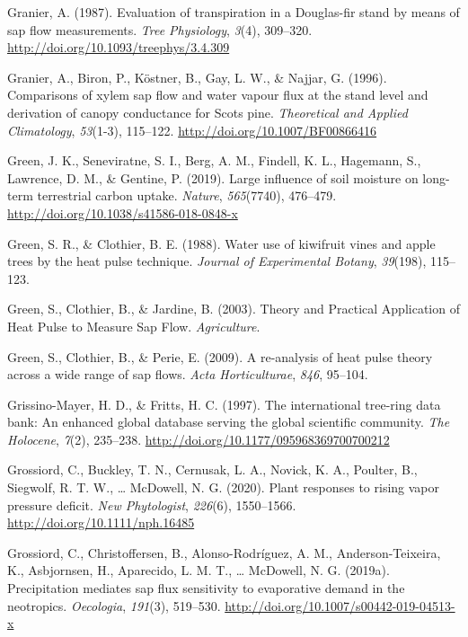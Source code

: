 \documentclass[11pt,twoside]{reedthesis}
\begin{document}
\hypertarget{ref-Granier1987}{}
Granier, A. (1987). Evaluation of transpiration in a Douglas-fir stand
by means of sap flow measurements. \emph{Tree Physiology}, \emph{3}(4),
309--320. \url{http://doi.org/10.1093/treephys/3.4.309}

\hypertarget{ref-Granier1996}{}
Granier, A., Biron, P., Köstner, B., Gay, L. W., \& Najjar, G. (1996).
Comparisons of xylem sap flow and water vapour flux at the stand level
and derivation of canopy conductance for Scots pine. \emph{Theoretical
and Applied Climatology}, \emph{53}(1-3), 115--122.
\url{http://doi.org/10.1007/BF00866416}

\hypertarget{ref-green_large_2019}{}
Green, J. K., Seneviratne, S. I., Berg, A. M., Findell, K. L., Hagemann,
S., Lawrence, D. M., \& Gentine, P. (2019). Large influence of soil
moisture on long-term terrestrial carbon uptake. \emph{Nature},
\emph{565}(7740), 476--479.
\url{http://doi.org/10.1038/s41586-018-0848-x}

\hypertarget{ref-Green1988}{}
Green, S. R., \& Clothier, B. E. (1988). Water use of kiwifruit vines
and apple trees by the heat pulse technique. \emph{Journal of
Experimental Botany}, \emph{39}(198), 115--123.

\hypertarget{ref-Green2003}{}
Green, S., Clothier, B., \& Jardine, B. (2003). Theory and Practical
Application of Heat Pulse to Measure Sap Flow. \emph{Agriculture}.

\hypertarget{ref-Green2009}{}
Green, S., Clothier, B., \& Perie, E. (2009). A re-analysis of heat
pulse theory across a wide range of sap flows. \emph{Acta
Horticulturae}, \emph{846}, 95--104.

\hypertarget{ref-Henri1997}{}
Grissino-Mayer, H. D., \& Fritts, H. C. (1997). The international
tree-ring data bank: An enhanced global database serving the global
scientific community. \emph{The Holocene}, \emph{7}(2), 235--238.
\url{http://doi.org/10.1177/095968369700700212}

\hypertarget{ref-grossiord_plant_2020}{}
Grossiord, C., Buckley, T. N., Cernusak, L. A., Novick, K. A., Poulter,
B., Siegwolf, R. T. W., \ldots{} McDowell, N. G. (2020). Plant responses
to rising vapor pressure deficit. \emph{New Phytologist}, \emph{226}(6),
1550--1566. \url{http://doi.org/10.1111/nph.16485}

\hypertarget{ref-grossiord2019}{}
Grossiord, C., Christoffersen, B., Alonso-Rodríguez, A. M.,
Anderson-Teixeira, K., Asbjornsen, H., Aparecido, L. M. T., \ldots{}
McDowell, N. G. (2019a). Precipitation mediates sap flux sensitivity to
evaporative demand in the neotropics. \emph{Oecologia}, \emph{191}(3),
519--530. \url{http://doi.org/10.1007/s00442-019-04513-x}
\end{document}
